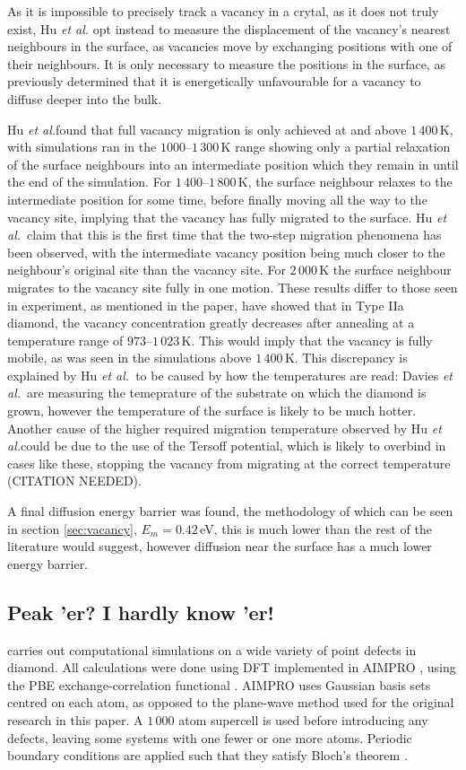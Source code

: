 \documentclass[10pt,a4paper,twocolumn,twoside]{extarticle}
\newcommand{\al}{\emph{et al.}}
\begin{document}
As it is impossible to precisely track a vacancy in a crytal, as it does not truly exist, Hu {\al} opt instead to measure the displacement of the vacancy's nearest neighbours in the surface, as vacancies move by exchanging positions with one of their neighbours. It is only necessary to measure the positions in the surface, as \textcite{Halicioglu} previously determined that it is energetically unfavourable for a vacancy to diffuse deeper into the bulk. 

Hu \al found that full vacancy migration is only achieved at and above $1\,400$\,K, with simulations ran in the $1000$--$1\,300$\,K range showing only a partial relaxation of the surface neighbours into an intermediate position which they remain in until the end of the simulation. For $1\,400$--$1\,800$\,K, the surface neighbour relaxes to the intermediate position for some time, before finally moving all the way to the vacancy site, implying that the vacancy has fully migrated to the surface. Hu \al~claim that this is the first time that the two-step migration phenomena has been observed, with the intermediate vacancy position being much closer to the neighbour's original site than the vacancy site. For $2\,000$\,K the surface neighbour migrates to the vacancy site fully in one motion. These results differ to those seen in experiment, as mentioned in the paper, \textcite{Davies} have showed that in Type IIa diamond, the vacancy concentration greatly decreases after annealing at a temperature range of $973$--$1\,023$\,K. This would imply that the vacancy is fully mobile, as was seen in the simulations above $1\,400$\,K. This discrepancy is explained by Hu \al~to be caused by how the temperatures are read: Davies \al~are measuring the temeprature of the substrate on which the diamond is grown, however the temperature of the surface is likely to be much hotter. Another cause of the higher required migration temperature observed by Hu \al could be due to the use of the Tersoff potential, which is likely to overbind in cases like these, stopping the vacancy from migrating at the correct temperature (CITATION NEEDED).

A final diffusion energy barrier was found, the methodology of which can be seen in section \ref{sec:vacancy}, $E_m = 0.42$\,eV, this is much lower than the rest of the literature would suggest, however diffusion near the surface has a much lower energy barrier.

\subsection{Peak 'er? I hardly know 'er!}
\textcite{Peaker} carries out computational simulations on a wide variety of point defects in diamond. All calculations were done using DFT implemented in AIMPRO \cite{AIMPRO}, using the PBE exchange-correlation functional \cite{PBE}. AIMPRO uses Gaussian basis sets centred on each atom, as opposed to the plane-wave method used for the original research in this paper. A $1\,000$ atom supercell is used before introducing any defects, leaving some systems with one fewer or one more atoms. Periodic boundary conditions are applied such that they satisfy Bloch's theorem \cite{Bloch}. 
\end{document}
